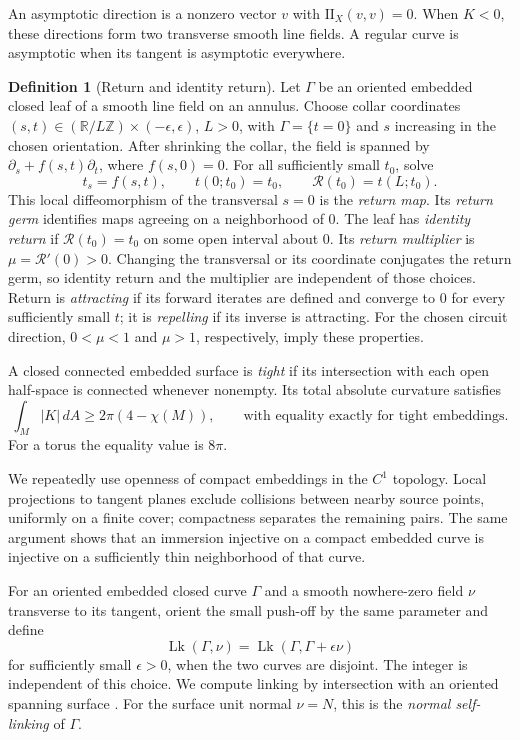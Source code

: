 \documentclass[11pt]{amsart}
\theoremstyle{definition}
\newtheorem{definition}[theorem]{Definition}
\theoremstyle{remark}
\newcommand{\R}{\mathbb R}\newcommand{\Sph}{\mathbb S}
\DeclareMathOperator{\Lk}{Lk}
\newcommand{\II}{\mathrm{II}}\newcommand{\Gmap}{\mathcal G}
\numberwithin{equation}{section}
\begin{document}
An asymptotic direction is a nonzero vector $v$ with $\II_X(v,v)=0$.
When $K<0$, these directions form two transverse smooth line fields.
A regular curve is asymptotic when its tangent is asymptotic everywhere.

\begin{definition}[Return and identity return]\label{def:return}
Let $\Gamma$ be an oriented embedded closed leaf of a smooth line field
on an annulus. Choose collar coordinates
$(s,t)\in(\R/L\mathbb Z)\times(-\epsilon,\epsilon)$, $L>0$, with
$\Gamma=\{t=0\}$ and $s$ increasing in the chosen orientation.
After shrinking the collar, the field is spanned by
$\partial_s+f(s,t)\partial_t$, where $f(s,0)=0$.
For all sufficiently small $t_0$, solve
\[
 t_s=f(s,t),\qquad t(0;t_0)=t_0,
 \qquad \mathcal R(t_0)=t(L;t_0).
\]
This local diffeomorphism of the transversal $s=0$ is the \emph{return
map}. Its \emph{return germ} identifies maps agreeing on a neighborhood
of $0$. The leaf has \emph{identity return} if
$\mathcal R(t_0)=t_0$ on some open interval about $0$.
Its \emph{return multiplier} is $\mu=\mathcal R'(0)>0$.
Changing the transversal or its coordinate conjugates the return germ,
so identity return and the multiplier are independent of those choices.
Return is \emph{attracting} if its forward iterates are defined and
converge to $0$ for every sufficiently small $t$; it is \emph{repelling}
if its inverse is attracting. For the chosen circuit direction,
$0<\mu<1$ and $\mu>1$, respectively, imply these properties.
\end{definition}

A closed connected embedded surface is \emph{tight} if its intersection
with each open half-space is connected whenever nonempty. Its total
absolute curvature satisfies \cite[\S1.1]{BK}
\begin{equation}\label{eq:tight-bound}
 \int_M|K|\,dA\ge2\pi(4-\chi(M)),
 \qquad\text{with equality exactly for tight embeddings}.
\end{equation}
For a torus the equality value is $8\pi$.

We repeatedly use openness of compact embeddings in the $C^1$ topology.
Local projections to tangent planes exclude collisions between nearby
source points, uniformly on a finite cover; compactness separates the
remaining pairs. The same argument shows that an immersion injective on
a compact embedded curve is injective on a sufficiently thin neighborhood
of that curve.

For an oriented embedded closed curve $\Gamma$ and a smooth nowhere-zero
field $\nu$ transverse to its tangent, orient the small push-off by the
same parameter and define
\[
 \Lk(\Gamma,\nu)=\Lk(\Gamma,\Gamma+\epsilon\nu)
\]
for sufficiently small $\epsilon>0$, when the two curves are disjoint.
The integer is independent of this choice. We compute linking by intersection with an
oriented spanning surface \cite{Rolfsen}.
For the surface unit normal $\nu=N$, this is the \emph{normal self-linking}
of $\Gamma$.
\end{document}
